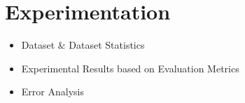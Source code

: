 \section*{Experimentation}

\begin{itemize}
    \item Dataset \& Dataset Statistics
    \item Experimental Results based on Evaluation Metrics
    \item Error Analysis
\end{itemize}
